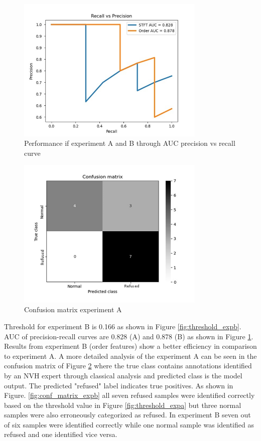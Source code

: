 \documentclass[a4paper, 10pt, twocolumn]{article}
\begin{document}
\begin{figure}[hbt]
\begin{center}
    

\includegraphics[width=9cm]{auc.png}
\end{center}
\caption{Performance if experiment A and B through AUC precision vs recall curve}
\label{fig:auc_expa_expb}
\end{figure}
    

\begin{figure}[hbt]
\begin{center}
    

\includegraphics[width=9cm]{conf_matrix_stft.png}
\end{center}
\caption{Confusion matrix experiment A}
\label{fig:conf_matrix_expa}
\end{figure}
Threshold for experiment B is 0.166 as shown in Figure \ref{fig:threshold_expb}. AUC of precision-recall curves are 0.828 (A) and 0.878 (B) as shown in Figure \ref{fig:auc_expa_expb}. Results from experiment B (order features) show a better efficiency in comparison to experiment A. A more detailed analysis of the experiment A can be seen in the confusion matrix of Figure \ref{fig:conf_matrix_expa} where the true class contains annotations identified by an NVH expert through classical analysis and predicted class is the model output. The predicted "refused" label indicates true positives. As shown in Figure. \ref{fig:conf_matrix_expb} all seven refused samples were identified correctly based on the threshold value in Figure \ref{fig:threshold_expa} but three normal samples were also erroneously categorized as refused. In experiment B seven out of six samples were identified correctly while one normal sample was identified as refused and one identified vice versa.    
\end{document}
